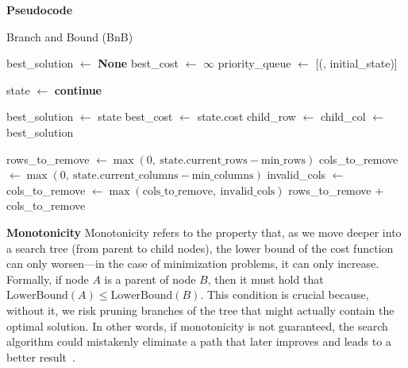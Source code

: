 \documentclass[a4paper,12pt]{article}
\begin{document}
\textbf{Pseudocode}
\begin{algorithm}[H]
\caption{Branch and Bound (BnB)}
\begin{algorithmic}[1]
    \State best\_solution $\gets$ \textbf{None}
    \State best\_cost $\gets$ $\infty$
    \State priority\_queue $\gets$ [(, initial\_state)]
    
        \State state $\gets$ 
            \State \textbf{continue} 
        \EndIf
        
                \State best\_solution $\gets$ state
                \State best\_cost $\gets$ state.cost
            \EndIf
        \Else
            \State child\_row $\gets$ 
            \State child\_col $\gets$ 
            \State {}
            \State {}
        \EndIf
    \EndWhile
    \State \Return best\_solution
\EndFunction

\vspace{1em}

    \State rows\_to\_remove $\gets \max(0,\ \text{state.current\_rows} - \text{min\_rows})$
    \State cols\_to\_remove $\gets \max(0,\ \text{state.current\_columns} - \text{min\_columns})$
    \State invalid\_cols $\gets$ 
    \State cols\_to\_remove $\gets \max(\text{cols\_to\_remove},\ \text{invalid\_cols})$
    \State \Return rows\_to\_remove $+$ cols\_to\_remove
\EndFunction
\end{algorithmic}
\end{algorithm}

\textbf{Monotonicity}  
Monotonicity refers to the property that, as we move deeper into a search tree (from parent to child nodes), the lower bound of the cost function can only worsen—in the case of minimization problems, it can only increase. Formally, if node \(A\) is a parent of node \(B\), then it must hold that \(\text{LowerBound}(A) \leq \text{LowerBound}(B)\). This condition is crucial because, without it, we risk pruning branches of the tree that might actually contain the optimal solution. In other words, if monotonicity is not guaranteed, the search algorithm could mistakenly eliminate a path that later improves and leads to a better result~\cite{34}.
\end{document}
